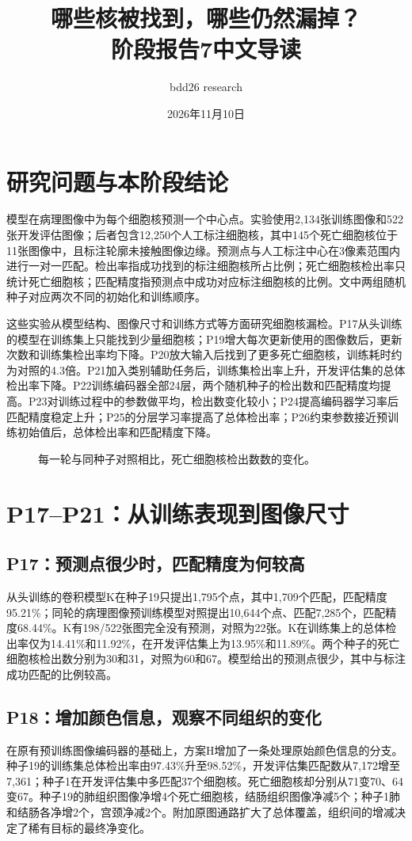 \documentclass[UTF8,zihao=-4,fontset=windows]{ctexart}
\title{\bfseries 哪些核被找到，哪些仍然漏掉？\\\large 阶段报告7中文导读}\author{bdd26 research}\date{2026年11月10日}
\begin{document}
\maketitle
\section{研究问题与本阶段结论}
模型在病理图像中为每个细胞核预测一个中心点。实验使用2,134张训练图像和522张开发评估图像；后者包含12,250个人工标注细胞核，其中145个死亡细胞核位于11张图像中，且标注轮廓未接触图像边缘。预测点与人工标注中心在3像素范围内进行一对一匹配。检出率指成功找到的标注细胞核所占比例；死亡细胞核检出率只统计死亡细胞核；匹配精度指预测点中成功对应标注细胞核的比例。文中两组随机种子对应两次不同的初始化和训练顺序。

这些实验从模型结构、图像尺寸和训练方式等方面研究细胞核漏检。P17从头训练的模型在训练集上只能找到少量细胞核；P19增大每次更新使用的图像数后，更新次数和训练集检出率均下降。P20放大输入后找到了更多死亡细胞核，训练耗时约为对照的4.3倍。P21加入类别辅助任务后，训练集检出率上升，开发评估集的总体检出率下降。P22训练编码器全部24层，两个随机种子的检出数和匹配精度均提高。P23对训练过程中的参数做平均，检出数变化较小；P24提高编码器学习率后匹配精度稳定上升；P25的分层学习率提高了总体检出率；P26约束参数接近预训练初始值后，总体检出率和匹配精度下降。
\begin{figure}[H]\centering\caption{每一轮与同种子对照相比，死亡细胞核检出数数的变化。}\end{figure}
\section{P17--P21：从训练表现到图像尺寸}
\subsection{P17：预测点很少时，匹配精度为何较高}
从头训练的卷积模型K在种子19只提出1,795个点，其中1,709个匹配，匹配精度95.21\%；同轮的病理图像预训练模型对照提出10,644个点、匹配7,285个，匹配精度68.44\%。K有198/522张图完全没有预测，对照为22张。K在训练集上的总体检出率仅为14.41\%和11.92\%，在开发评估集上为13.95\%和11.89\%。两个种子的死亡细胞核检出数分别为30和31，对照为60和67。模型给出的预测点很少，其中与标注成功匹配的比例较高。

\subsection{P18：增加颜色信息，观察不同组织的变化}
在原有预训练图像编码器的基础上，方案H增加了一条处理原始颜色信息的分支。种子19的训练集总体检出率由97.43\%升至98.52\%，开发评估集匹配数从7,172增至7,361；种子1在开发评估集中多匹配37个细胞核。死亡细胞核却分别从71变70、64变67。种子19的肺组织图像净增4个死亡细胞核，结肠组织图像净减5个；种子1肺和结肠各净增2个，宫颈净减2个。附加原图通路扩大了总体覆盖，组织间的增减决定了稀有目标的最终净变化。
\end{document}
